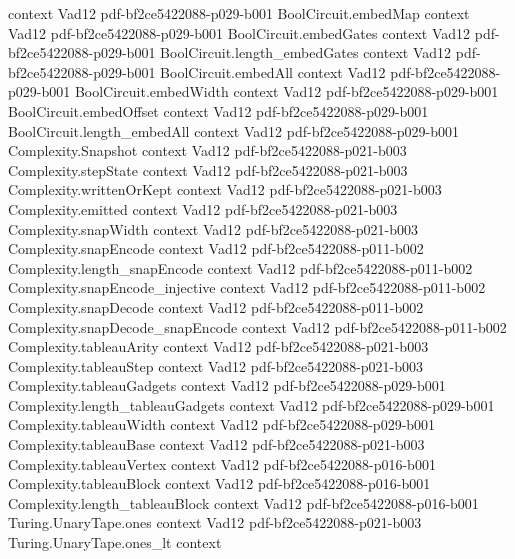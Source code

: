 \begin{theorem}
  {context}
  {Vad12}
  {pdf-bf2ce5422088-p029-b001}
\proofstep
  {BoolCircuit.embedMap}
  {context}
  {Vad12}
  {pdf-bf2ce5422088-p029-b001}
\proofstep
  {BoolCircuit.embedGates}
  {context}
  {Vad12}
  {pdf-bf2ce5422088-p029-b001}
\proofstep
  {BoolCircuit.length_embedGates}
  {context}
  {Vad12}
  {pdf-bf2ce5422088-p029-b001}
\proofstep
  {BoolCircuit.embedAll}
  {context}
  {Vad12}
  {pdf-bf2ce5422088-p029-b001}
\proofstep
  {BoolCircuit.embedWidth}
  {context}
  {Vad12}
  {pdf-bf2ce5422088-p029-b001}
\proofstep
  {BoolCircuit.embedOffset}
  {context}
  {Vad12}
  {pdf-bf2ce5422088-p029-b001}
\proofstep
  {BoolCircuit.length_embedAll}
  {context}
  {Vad12}
  {pdf-bf2ce5422088-p029-b001}
\proofstep
  {Complexity.Snapshot}
  {context}
  {Vad12}
  {pdf-bf2ce5422088-p021-b003}
\proofstep
  {Complexity.stepState}
  {context}
  {Vad12}
  {pdf-bf2ce5422088-p021-b003}
\proofstep
  {Complexity.writtenOrKept}
  {context}
  {Vad12}
  {pdf-bf2ce5422088-p021-b003}
\proofstep
  {Complexity.emitted}
  {context}
  {Vad12}
  {pdf-bf2ce5422088-p021-b003}
\proofstep
  {Complexity.snapWidth}
  {context}
  {Vad12}
  {pdf-bf2ce5422088-p021-b003}
\proofstep
  {Complexity.snapEncode}
  {context}
  {Vad12}
  {pdf-bf2ce5422088-p011-b002}
\proofstep
  {Complexity.length_snapEncode}
  {context}
  {Vad12}
  {pdf-bf2ce5422088-p011-b002}
\proofstep
  {Complexity.snapEncode_injective}
  {context}
  {Vad12}
  {pdf-bf2ce5422088-p011-b002}
\proofstep
  {Complexity.snapDecode}
  {context}
  {Vad12}
  {pdf-bf2ce5422088-p011-b002}
\proofstep
  {Complexity.snapDecode_snapEncode}
  {context}
  {Vad12}
  {pdf-bf2ce5422088-p011-b002}
\proofstep
  {Complexity.tableauArity}
  {context}
  {Vad12}
  {pdf-bf2ce5422088-p021-b003}
\proofstep
  {Complexity.tableauStep}
  {context}
  {Vad12}
  {pdf-bf2ce5422088-p021-b003}
\proofstep
  {Complexity.tableauGadgets}
  {context}
  {Vad12}
  {pdf-bf2ce5422088-p029-b001}
\proofstep
  {Complexity.length_tableauGadgets}
  {context}
  {Vad12}
  {pdf-bf2ce5422088-p029-b001}
\proofstep
  {Complexity.tableauWidth}
  {context}
  {Vad12}
  {pdf-bf2ce5422088-p029-b001}
\proofstep
  {Complexity.tableauBase}
  {context}
  {Vad12}
  {pdf-bf2ce5422088-p021-b003}
\proofstep
  {Complexity.tableauVertex}
  {context}
  {Vad12}
  {pdf-bf2ce5422088-p016-b001}
\proofstep
  {Complexity.tableauBlock}
  {context}
  {Vad12}
  {pdf-bf2ce5422088-p016-b001}
\proofstep
  {Complexity.length_tableauBlock}
  {context}
  {Vad12}
  {pdf-bf2ce5422088-p016-b001}
\proofstep
  {Turing.UnaryTape.ones}
  {context}
  {Vad12}
  {pdf-bf2ce5422088-p021-b003}
\proofstep
  {Turing.UnaryTape.ones_lt}
  {context}

\end{theorem}
